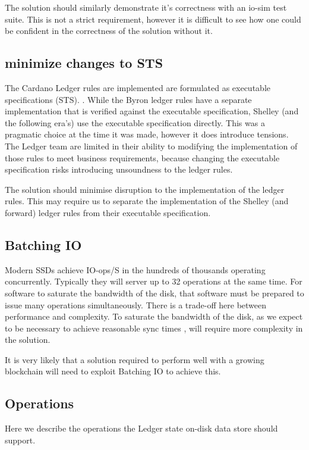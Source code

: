 \documentclass[11pt,a4paper]{article}
\begin{document}
The solution should similarly demonstrate it's correctness with an io-sim test
suite. This is not a strict requirement, however it is difficult to see how one
could be confident in the correctness of the solution without it.

\subsection{minimize changes to STS}

The Cardano Ledger rules are implemented are formulated as executable
specifications (STS). . While the Byron ledger rules have
a separate implementation that is verified against the executable specification,
Shelley (and the following era's) use the executable specification directly.
This was a pragmatic choice at the time it was made, however it does introduce
tensions. The Ledger team are limited in their ability to modifying the
implementation of those rules to meet business requirements, because changing
the executable specification risks introducing unsoundness to the ledger rules.

The solution should minimise disruption to the implementation of the ledger
rules. This may require us to separate the implementation of the Shelley (and
forward) ledger rules from their executable specification.

\subsection{Batching IO}
\label{Batching IO}
Modern SSDs achieve IO-ops/S in the hundreds of thousands operating concurrently.
Typically they will server up to 32 operations at the same time. For software to
saturate the bandwidth of the disk, that software must be prepared to issue many
operations simultaneously. There is a trade-off here between performance and
complexity. To saturate the bandwidth of the disk, as we expect to be necessary
to achieve reasonable sync times , will require more complexity in
the solution.

It is very likely that a solution required to perform well with a growing
blockchain will need to exploit Batching IO to achieve this.

\subsection{Operations}
\label{Operations}
Here we describe the operations the Ledger state on-disk data store should
support.
\end{document}
